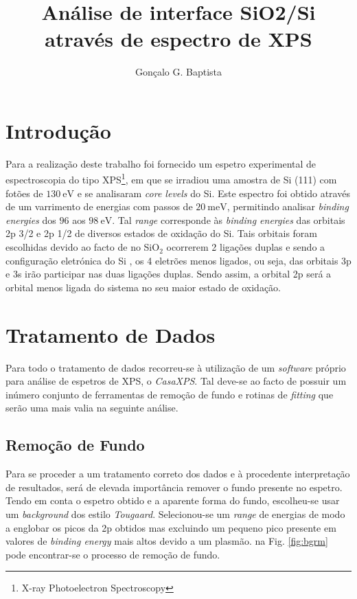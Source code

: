 \documentclass[baaa]{baaa}
\title{Análise de interface SiO2/Si\\através de espectro de XPS}
\author{
Gonçalo G. Baptista\inst{1}
}
\institute{
NOVA School of Science and Technology, NOVA SST, Portugal
}
\begin{document}
\maketitle

\section{Introdução}\label{S_intro}

Para a realização deste trabalho foi fornecido um espetro experimental de espectroscopia do tipo XPS\footnote{X-ray Photoelectron Spectroscopy}, em que se irradiou uma amostra de Si (111) com fotões de $130\ \si{\electronvolt}$ e se analisaram \textit{core levels} do Si. Este espectro foi obtido através de um varrimento de energias com passos de $20\ \si{\milli\electronvolt}$, permitindo analisar \textit{binding energies} dos $96$ aos $98\ \si{\electronvolt}$. Tal \textit{range} corresponde às \textit{binding energies} das orbitais 2p 3/2 e 2p 1/2 de diversos estados de oxidação do Si. Tais orbitais foram escolhidas devido ao facto de no SiO$_2$ ocorrerem 2 ligações duplas e sendo a configuração eletrónica do Si , os 4 eletrões menos ligados, ou seja, das orbitais 3p e 3s irão participar nas duas ligações duplas. Sendo assim, a orbital 2p será a orbital menos ligada do sistema no seu maior estado de oxidação.


\section{Tratamento de Dados}
Para todo o tratamento de dados recorreu-se à utilização de um \textit{software} próprio para análise de espetros de XPS, o \textit{CasaXPS}. Tal deve-se ao facto de possuir um inúmero conjunto de ferramentas de remoção de fundo e rotinas de \textit{fitting} que serão uma mais valia na seguinte análise.


\subsection{Remoção de Fundo}

Para se proceder a um tratamento correto dos dados e à procedente interpretação de resultados, será de elevada importância remover o fundo presente no espetro. Tendo em conta o espetro obtido e a aparente forma do fundo, escolheu-se usar um \textit{background} dos estilo \textit{Tougaard}. Selecionou-se um \textit{range} de energias de modo a englobar os picos da 2p obtidos mas excluindo um pequeno pico presente em valores de \textit{binding energy} mais altos devido a um plasmão. na Fig. \ref{fig:bgrm} pode encontrar-se o processo de remoção de fundo.
\end{document}
